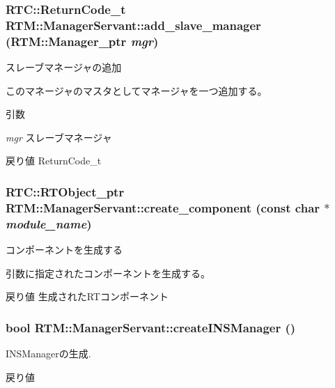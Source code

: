 \subsubsection[{add\_\-slave\_\-manager}]{\setlength{\rightskip}{0pt plus 5cm}RTC::ReturnCode\_\-t RTM::ManagerServant::add\_\-slave\_\-manager (RTM::Manager\_\-ptr {\em mgr})}\label{classRTM_1_1ManagerServant_a7f3cd417fe64ae217719776634cdabb8}


スレーブマネージャの追加 

このマネージャのマスタとしてマネージャを一つ追加する。


\begin{DoxyParams}{引数}
\item[{\em mgr}]スレーブマネージャ \end{DoxyParams}
\begin{DoxyReturn}{戻り値}
ReturnCode\_\-t 
\end{DoxyReturn}
\subsubsection[{create\_\-component}]{\setlength{\rightskip}{0pt plus 5cm}RTC::RTObject\_\-ptr RTM::ManagerServant::create\_\-component (const char $\ast$ {\em module\_\-name})}\label{classRTM_1_1ManagerServant_a7c46e44473f1a792f9b9f47cb7fc08a4}


コンポーネントを生成する 

引数に指定されたコンポーネントを生成する。

\begin{DoxyReturn}{戻り値}
生成されたRTコンポーネント 
\end{DoxyReturn}
\subsubsection[{createINSManager}]{\setlength{\rightskip}{0pt plus 5cm}bool RTM::ManagerServant::createINSManager ()}\label{classRTM_1_1ManagerServant_a824001f679a58c1bb965a17b4533981c}


INSManagerの生成. 

\begin{DoxyReturn}{戻り値}

\end{DoxyReturn}
